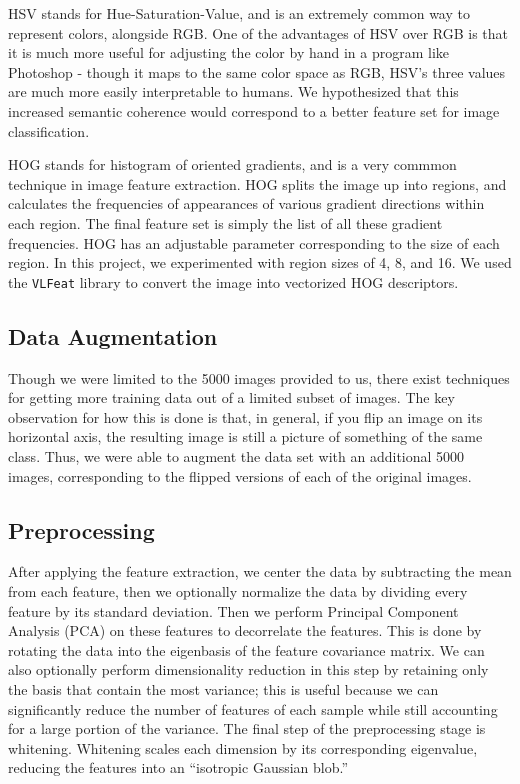 \documentclass{article} %
\begin{document}
HSV stands for Hue-Saturation-Value, and is an extremely common way to represent colors, alongside RGB. One of the advantages of HSV over RGB is that it is much more useful for adjusting the color by hand in a program like Photoshop - though it maps to the same color space as RGB, HSV's three values are much more easily interpretable to humans. We hypothesized that this increased semantic coherence would correspond to a better feature set for image classification.

HOG stands for histogram of oriented gradients, and is a very commmon technique in image feature extraction. HOG splits the image up into regions, and calculates the frequencies of appearances of various gradient directions within each region. The final feature set is simply the list of all these gradient frequencies. HOG has an adjustable parameter corresponding to the size of each region. In this project, we experimented with region sizes of 4, 8, and 16. We used the \verb|VLFeat| library to convert the image into vectorized HOG descriptors.

\subsection*{Data Augmentation}
Though we were limited to the 5000 images provided to us, there exist techniques for getting more training data out of a limited subset of images. The key observation for how this is done is that, in general, if you flip an image on its horizontal axis, the resulting image is still a picture of something of the same class. Thus, we were able to augment the data set with an additional 5000 images, corresponding to the flipped versions of each of the original images.

\subsection*{Preprocessing}

After applying the feature extraction, we center the data by subtracting the mean from each feature, then we optionally normalize the data by dividing every feature by its standard deviation. Then we perform Principal Component Analysis (PCA) on these features to decorrelate the features. This is done by rotating the data into the eigenbasis of the feature covariance matrix. We can also optionally perform dimensionality reduction in this step by retaining only the basis that contain the most variance; this is useful because we can significantly reduce the number of features of each sample while still accounting for a large portion of the variance. The final step of the preprocessing stage is whitening. Whitening scales each dimension by its corresponding eigenvalue, reducing the features into an ``isotropic Gaussian blob.''
\end{document}

